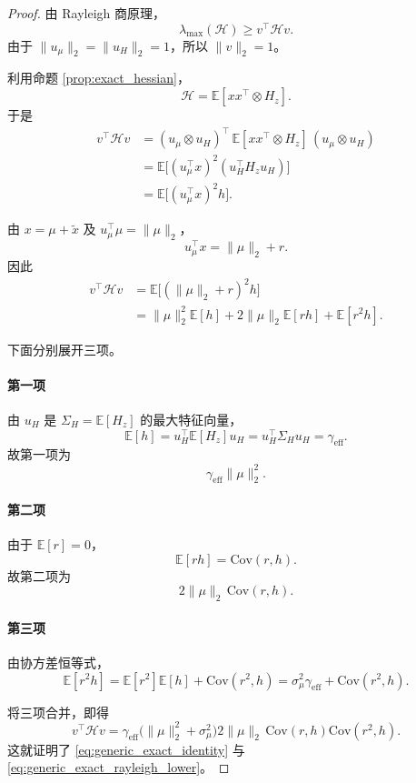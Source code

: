 \documentclass[11pt]{ctexart}
\begin{document}
\begin{proof}
由 Rayleigh 商原理，
\[
\lambda_{\max}(\mathcal{H}) \ge v^\top \mathcal{H} v.
\]
由于 $\|u_\mu\|_2 = \|u_H\|_2 = 1$，所以 $\|v\|_2=1$。

利用命题 \ref{prop:exact_hessian}，
\[
\mathcal{H} = \mathbb{E}[xx^\top \otimes H_z].
\]
于是
\begin{align*}
v^\top \mathcal{H} v
&= (u_\mu \otimes u_H)^\top \, \mathbb{E}[xx^\top \otimes H_z] \, (u_\mu \otimes u_H) \\
&= \mathbb{E}\big[(u_\mu^\top x)^2 (u_H^\top H_z u_H)\big] \\
&= \mathbb{E}\big[(u_\mu^\top x)^2 h\big].
\end{align*}

由 $x=\mu+\tilde{x}$ 及 $u_\mu^\top \mu = \|\mu\|_2$，
\[
u_\mu^\top x = \|\mu\|_2 + r.
\]
因此
\begin{align*}
v^\top \mathcal{H} v
&= \mathbb{E}\big[(\|\mu\|_2 + r)^2 h\big] \\
&= \|\mu\|_2^2 \mathbb{E}[h]
 + 2\|\mu\|_2 \mathbb{E}[rh]
 + \mathbb{E}[r^2 h].
\end{align*}

下面分别展开三项。

\paragraph{第一项}
由 $u_H$ 是 $\Sigma_H = \mathbb{E}[H_z]$ 的最大特征向量，
\[
\mathbb{E}[h]
= u_H^\top \mathbb{E}[H_z] u_H
= u_H^\top \Sigma_H u_H
= \gamma_{\mathrm{eff}}.
\]
故第一项为
\[
\gamma_{\mathrm{eff}} \|\mu\|_2^2.
\]

\paragraph{第二项}
由于 $\mathbb{E}[r]=0$，
\[
\mathbb{E}[rh] = \mathrm{Cov}(r,h).
\]
故第二项为
\[
2\|\mu\|_2 \,\mathrm{Cov}(r,h).
\]

\paragraph{第三项}
由协方差恒等式，
\[
\mathbb{E}[r^2 h]
= \mathbb{E}[r^2]\mathbb{E}[h] + \mathrm{Cov}(r^2,h)
= \sigma_\mu^2 \gamma_{\mathrm{eff}} + \mathrm{Cov}(r^2,h).
\]

将三项合并，即得
\[
v^\top \mathcal{H} v
= \gamma_{\mathrm{eff}}\big(\|\mu\|_2^2+\sigma_\mu^2\big)
 2\|\mu\|_2\,\mathrm{Cov}(r,h)
 \mathrm{Cov}(r^2,h).
\]
这就证明了 \eqref{eq:generic_exact_identity} 与 \eqref{eq:generic_exact_rayleigh_lower}。
\end{proof}
\end{document}
